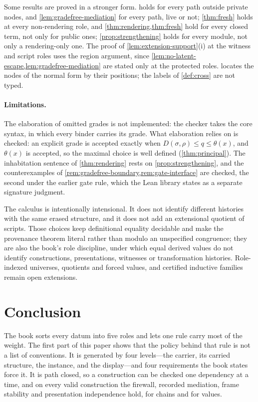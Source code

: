 \documentclass[11pt]{article}
\numberwithin{equation}{section}
\theoremstyle{definition}
\theoremstyle{plain}
\theoremstyle{remark}
\begin{document}
Some results are proved in a stronger form.  
holds for every path outside private nodes, and \cref{lem:gradefree-mediation}
for every path, live or not; \cref{thm:fresh} holds at every
non-rendering role, and \cref{thm:rendering,thm:fresh} hold for every closed
term, not only for public ones; \cref{prop:strengthening} holds for every
module, not only a rendering-only one.  The
proof of \cref{lem:extension-support}(i) at the witness and script roles
uses the region argument, since \cref{lem:no-latent-escape,lem:gradefree-mediation}
are stated only at the protected roles.   locates the
nodes of the normal form by their positions; the labels of
\cref{def:cross} are not typed.

\paragraph{Limitations.}
The elaboration of omitted grades is not implemented: the checker takes the
core syntax, in which every binder carries its grade.  What elaboration relies
on is checked: an explicit grade is accepted exactly when
\(D(\sigma,\rho)\le q\le\theta(x)\), and \(\theta(x)\) is accepted, so the
maximal choice is well defined (\cref{thm:principal}).  The inhabitation
sentence of \cref{thm:rendering} rests on \cref{prop:strengthening}, and the
counterexamples of \cref{rem:gradefree-boundary,rem:gate-interface} are
checked, the second under the earlier gate rule, which the Lean library states
as a separate signature judgment.

The calculus is intentionally intensional.  It does not identify different
histories with the same erased structure, and it does not add an extensional
quotient of scripts.  Those choices keep definitional equality decidable and
make the provenance theorem literal rather than modulo an unspecified
congruence; they are also the book's role discipline, under which equal
derived values do not identify constructions, presentations, witnesses or
transformation histories.  Role-indexed universes, quotients and forced
values, and certified inductive families remain open extensions.

\section{Conclusion}\label{sec:conclusion}

The book sorts every datum into five roles and lets one rule carry most of
the weight.  The first part of this paper shows that the policy behind that
rule is not a list of conventions.  It is generated by four levels---the
carrier, its carried structure, the instance, and the display---and four
requirements the book states force it.  It is path closed, so a construction
can be checked one dependency at a time, and on every valid construction the
firewall, recorded mediation, frame stability and presentation independence
hold, for chains and for values.
\end{document}
